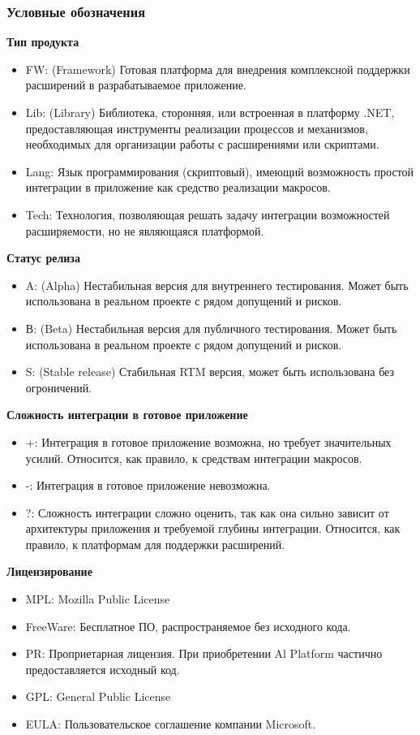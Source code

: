 \subsubsection{Условные обозначения}

{\bf Тип продукта}

\begin{itemize}
	\item FW: (Framework) Готовая платформа для внедрения комплексной поддержки расширений в разрабатываемое приложение.
	\item Lib: (Library) Библиотека, сторонняя, или встроенная в платформу .NET, предоставляющая инструменты реализации процессов и механизмов, необходимых для организации работы с расширениями или скриптами.
	\item Lang: Язык программирования (скриптовый), имеющий возможность простой интеграции в приложение как средство реализации макросов. 
	\item Tech: Технология, позволяющая решать задачу интеграции возможностей расширяемости, но не являющаяся платформой.
\end{itemize}

{\bf Статус релиза}

\begin{itemize}
	\item A: (Alpha) Нестабильная версия для внутреннего тестирования. Может быть использована в реальном проекте с рядом допущений и рисков.
	\item В: (Beta) Нестабильная версия для публичного тестирования. Может быть использована в реальном проекте с рядом допущений и рисков.
	\item S: (Stable release) Стабильная RTM версия, может быть использована без огроничений.
\end{itemize}

{\bf Сложность интеграции в готовое приложение}

\begin{itemize}
	\item +: Интеграция в готовое приложение возможна, но требует значительных усилий. Относится, как правило, к средствам интеграции макросов.
	\item -: Интеграция в готовое приложение невозможна.
	\item ?: Сложность интеграции сложно оценить, так как она сильно зависит от архитектуры приложения и требуемой глубины интеграции. Относится, как правило, к платформам для поддержки расширений.
\end{itemize}

{\bf Лицензирование}

\begin{itemize}
	\item MPL: Mozilla Public License
	\item FreeWare: Бесплатное ПО, распространяемое без исходного кода.
	\item PR: Проприетарная лицензия. При приобретении Al Platform частично предоставляется исходный код.
	\item GPL: General Public License
	\item EULA: Пользовательское соглашение компании Microsoft.
\end{itemize}